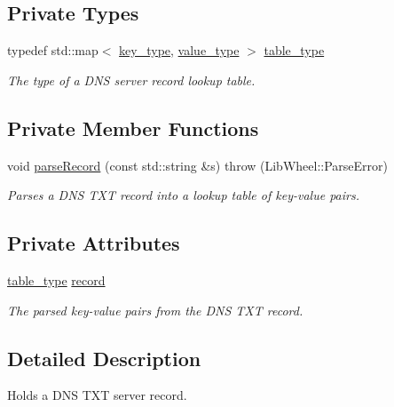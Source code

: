 \subsection*{\-Private \-Types}
\begin{DoxyCompactItemize}
\item 
typedef std\-::map$<$ \hyperlink{classNERD_1_1DnsServerRecord_ae4822fbc6f9564c337a67c40358e2810}{key\-\_\-type}, \*
\hyperlink{classNERD_1_1DnsServerRecord_aec809b0a9732f03885f5df5dd56f5f52}{value\-\_\-type} $>$ \hyperlink{classNERD_1_1DnsServerRecord_aeef40180a6b643af13b33122a73e8b0d}{table\-\_\-type}
\begin{DoxyCompactList}\small\item\em \-The type of a \-D\-N\-S server record lookup table. \end{DoxyCompactList}\end{DoxyCompactItemize}
\subsection*{\-Private \-Member \-Functions}
\begin{DoxyCompactItemize}
\item 
void \hyperlink{classNERD_1_1DnsServerRecord_a081a710f9819704a3da449c7bee3f583}{parse\-Record} (const std\-::string \&s)  throw (\-Lib\-Wheel\-::\-Parse\-Error)
\begin{DoxyCompactList}\small\item\em \-Parses a \-D\-N\-S \-T\-X\-T record into a lookup table of key-\/value pairs. \end{DoxyCompactList}\end{DoxyCompactItemize}
\subsection*{\-Private \-Attributes}
\begin{DoxyCompactItemize}
\item 
\hyperlink{classNERD_1_1DnsServerRecord_aeef40180a6b643af13b33122a73e8b0d}{table\-\_\-type} \hyperlink{classNERD_1_1DnsServerRecord_ae061df21d0b8072df5a38a88dbcb405e}{record}
\begin{DoxyCompactList}\small\item\em \-The parsed key-\/value pairs from the \-D\-N\-S \-T\-X\-T record. \end{DoxyCompactList}\end{DoxyCompactItemize}


\subsection{\-Detailed \-Description}
\-Holds a \-D\-N\-S \-T\-X\-T server record. 

